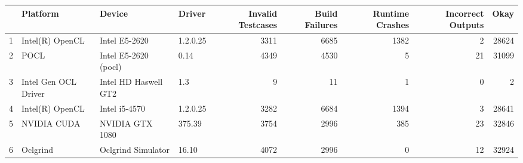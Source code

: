 \begin{tabular}{llllrrrrr}
\toprule
{} &              Platform &                Device &    Driver &  Invalid Testcases &  Build Failures &  Runtime Crashes &  Incorrect Outputs &   Okay \\
\midrule
1 &       Intel(R) OpenCL &         Intel E5-2620 &  1.2.0.25 &               3311 &            6685 &             1382 &                  2 &  28624 \\
2 &                  POCL &  Intel E5-2620 (pocl) &      0.14 &               4349 &            4530 &                5 &                 21 &  31099 \\
3 &  Intel Gen OCL Driver &  Intel HD Haswell GT2 &       1.3 &                  9 &              11 &                1 &                  0 &      2 \\
4 &       Intel(R) OpenCL &         Intel i5-4570 &  1.2.0.25 &               3282 &            6684 &             1394 &                  3 &  28641 \\
5 &           NVIDIA CUDA &       NVIDIA GTX 1080 &    375.39 &               3754 &            2996 &              385 &                 23 &  32846 \\
6 &              Oclgrind &    Oclgrind Simulator &     16.10 &               4072 &            2996 &                0 &                 12 &  32924 \\
\bottomrule
\end{tabular}
